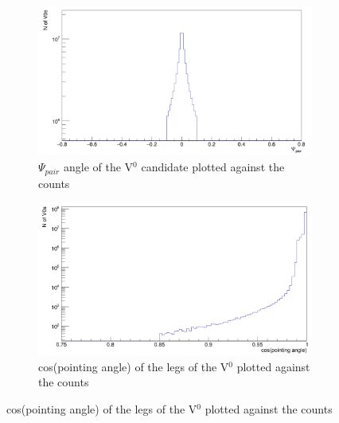 \begin{figure}
\centering
\begin{subfigure}[h]{.4\linewidth}
\includegraphics[width=1.0\linewidth]{Figures/V0cuts/V0psipair.png}
\caption{$\Psi_{pair}$ angle of the V$^0$ candidate plotted against the counts}
\label{fig:V0psipair}
\end{subfigure}\hspace{1cm}%
\begin{subfigure}[h]{.4\linewidth}
\includegraphics[width=1.0\linewidth]{Figures/V0cuts/V0cospa.png}
\caption{cos(pointing angle) of the legs of the V$^0$ plotted against the counts}
\label{fig:V0cospa}
\end{subfigure}

\vspace{0.7cm}


\end{figure}

